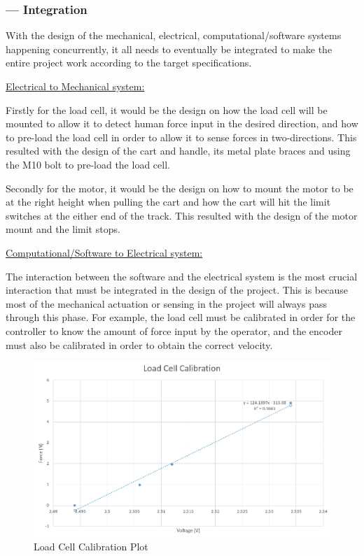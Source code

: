 \subsubsection*{ --- Integration}\par
With the design of the mechanical, electrical, computational/software systems happening concurrently, it all needs to eventually be integrated to make the entire project work according to the target specifications.\par
\vspace{.167in}
\noindent\underline{Electrical to Mechanical system:}\par
\vspace{.08in}
Firstly for the load cell, it would be the design on how the load cell will be mounted to allow it to detect human force input in the desired direction, and how to pre-load the load cell in order to allow it to sense forces in two-directions. This resulted with the design of the cart and handle, its metal plate braces and using the M10 bolt to pre-load the load cell.\par
Secondly for the motor, it would be the design on how to mount the motor to be at the right height when pulling the cart and how the cart will hit the limit switches at the either end of the track. This resulted with the design of the motor mount and the limit stops.\par
\vspace{.167in}
\noindent\underline{Computational/Software to Electrical system:} \par
\vspace{.08in}
The interaction between the software and the electrical system is the most crucial interaction that must be integrated in the design of the project. This is because most of the mechanical actuation or sensing in the project will always pass through this phase. For example, the load cell must be calibrated in order for the controller to know the amount of force input by the operator, and the encoder must also be calibrated in order to obtain the correct velocity. \par
\begin{figure}[H]
\begin{center}
\includegraphics[width=1\linewidth]{Images/load_cell_cali.PNG}
\caption{Load Cell Calibration Plot}
\label{LC_cali}
\end{center}
\end{figure}
